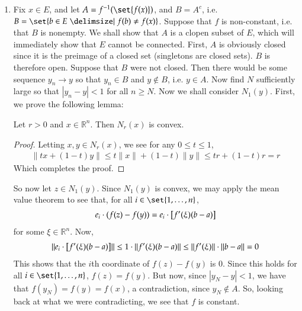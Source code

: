 \documentclass[12pt]{article}
\newenvironment{lemma}{\begin{mylemma}}{\end{mylemma}}
\theoremstyle{definitionstyle}
\def\mbb#1{\mathbb{#1}}
\def \R{\mbb{R}}
\newcommand{\mg}[1]{\| #1 \|}
\begin{document}
\begin{enumerate}[leftmargin=\labelsep]
		\item Fix $x \in E$, and let $A = f^{-1}(\set{f(x)})$, and $B = A^c$, i.e. $B = \set{b \in E \given f(b) \neq f(x)}$. Suppose that $f$ is non-constant, i.e. that $B$ is nonempty. We shall show that $A$ is a clopen subset of $E$, which will immediately show that $E$ cannot be connected. First, $A$ is obviously closed since it is the preimage of a closed set (singletons are closed sets). $B$ is therefore open. Suppose that $B$ were not closed. Then there would be some sequence $y_n \to y$ so that $y_n \in B$ and $y \not \in B$, i.e. $y \in A$. Now find $N$ sufficiently large so that $|y_n - y| < 1$ for all $n \geq N$. Now we shall consider $N_1(y)$. First, we prove the following lemma:
		\begin{lemma}
			Let $r > 0$ and $x \in \R^n$. Then $N_r(x)$ is convex.
		\end{lemma}
		\begin{proof}
			Letting $x, y \in N_r(x)$, we see for any $0 \leq t \leq 1$,
			\begin{align*}
				\mg{tx+(1-t)y} \leq t\mg{x} + (1-t)\mg{y} \leq tr + (1-t)r = r
			\end{align*}
		Which completes the proof.
		\end{proof}
		So now let $z \in N_1(y)$. Since $N_1(y)$ is convex, we may apply the mean value theorem to see that, for all $i \in \set{1, \ldots, n}$,
		\begin{align*}
			e_i \cdot (f(z) - f(y)) = e_i \cdot \qty[f'(\xi)(b-a)]
		\end{align*}
		for some $\xi \in \R^n$. Now, 
		\begin{align*}
			 \mg{e_i \cdot \qty[f'(\xi)(b-a)]} \leq 1 \cdot \mg{f'(\xi)(b-a)} \leq \mg{f'(\xi)} \cdot \mg{b-a} = 0
		\end{align*}
		This shows that the $i$th coordinate of $f(z) - f(y)$ is 0. Since this holds for all $i \in \set{1, \ldots, n}$, $f(z) = f(y)$. But now, since $|y_N - y| < 1$, we have that $f(y_N) = f(y) = f(x)$, a contradiction, since $y_N \not \in A$. So, looking back at what we were contradicting, we see that $f$ is constant.
		

\end{enumerate}
\end{document}
